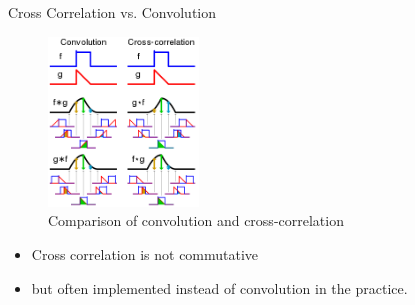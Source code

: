 \begin{vbframe}{Cross Correlation vs. Convolution}
    \begin{figure}
        \centering
        \includegraphics[width=4cm]{plots/other/conv_xcorrel.png}
        \caption{Comparison of convolution and cross-correlation}
    \end{figure}
    
    \begin{itemize}
    \item Cross correlation is not commutative
    \item but often implemented instead of convolution in the practice.
    \end{itemize}
\end{vbframe}




\endlecture
